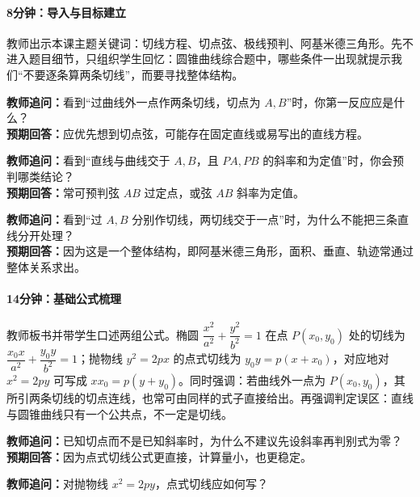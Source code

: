 \documentclass[UTF8,a4paper,11pt]{ctexart}
\begin{document}
\paragraph{8分钟：导入与目标建立}

教师出示本课主题关键词：$\text{切线方程}$、$\text{切点弦}$、$\text{极线预判}$、$\text{阿基米德三角形}$。先不进入题目细节，只组织学生回忆：圆锥曲线综合题中，哪些条件一出现就提示我们“不要逐条算两条切线”，而要寻找整体结构。

\noindent\textbf{教师追问：}看到“过曲线外一点作两条切线，切点为 $A,B$”时，你第一反应应是什么？\\

\textbf{预期回答：}应优先想到切点弦，可能存在固定直线或易写出的直线方程。\par

\noindent\textbf{教师追问：}看到“直线与曲线交于 $A,B$，且 $P A, P B$ 的斜率和为定值”时，你会预判哪类结论？\\

\textbf{预期回答：}常可预判弦 $AB$ 过定点，或弦 $AB$ 斜率为定值。\par

\noindent\textbf{教师追问：}看到“过 $A,B$ 分别作切线，两切线交于一点”时，为什么不能把三条直线分开处理？\\

\textbf{预期回答：}因为这是一个整体结构，即阿基米德三角形，面积、垂直、轨迹常通过整体关系求出。\par

\paragraph{14分钟：基础公式梳理}

教师板书并带学生口述两组公式。椭圆 $\dfrac{x^2}{a^2}+\dfrac{y^2}{b^2}=1$ 在点 $P(x_0,y_0)$ 处的切线为 $\dfrac{x_0x}{a^2}+\dfrac{y_0y}{b^2}=1$；抛物线 $y^2=2px$ 的点式切线为 $y_0y=p(x+x_0)$，对应地对 $x^2=2py$ 可写成 $xx_0=p(y+y_0)$。同时强调：若曲线外一点为 $P(x_0,y_0)$，其所引两条切线的切点连线，也常可由同样的式子直接给出。再强调判定误区：直线与圆锥曲线只有一个公共点，不一定是切线。

\noindent\textbf{教师追问：}已知切点而不是已知斜率时，为什么不建议先设斜率再判别式为零？\\

\textbf{预期回答：}因为点式切线公式更直接，计算量小，也更稳定。\par

\noindent\textbf{教师追问：}对抛物线 $x^2=2py$，点式切线应如何写？\\
\end{document}
